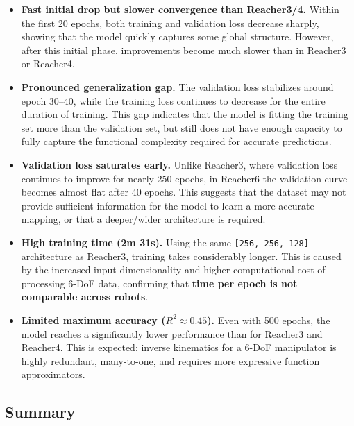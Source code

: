 \documentclass[a4paper,11pt]{article}
\begin{document}
\begin{itemize}

    \item \textbf{Fast initial drop but slower convergence than Reacher3/4.}  
    Within the first 20 epochs, both training and validation loss decrease 
    sharply, showing that the model quickly captures some global structure.  
    However, after this initial phase, improvements become much slower than in 
    Reacher3 or Reacher4.

    \item \textbf{Pronounced generalization gap.}  
    The validation loss stabilizes around epoch 30--40, while the training loss 
    continues to decrease for the entire duration of training.  
    This gap indicates that the model is fitting the training set more than the 
    validation set, but still does not have enough capacity to fully capture the 
    functional complexity required for accurate predictions.

    \item \textbf{Validation loss saturates early.}  
    Unlike Reacher3, where validation loss continues to improve for nearly 250 
    epochs, in Reacher6 the validation curve becomes almost flat after 40 epochs.  
    This suggests that the dataset may not provide sufficient information for the 
    model to learn a more accurate mapping, or that a deeper/wider architecture 
    is required.

    \item \textbf{High training time (2m 31s).}  
    Using the same \texttt{[256, 256, 128]} architecture as Reacher3, training 
    takes considerably longer.  
    This is caused by the increased input dimensionality and higher computational 
    cost of processing 6-DoF data, confirming that \textbf{time per epoch is not 
    comparable across robots}.

    \item \textbf{Limited maximum accuracy ($R^2 \approx 0.45$).}  
    Even with 500 epochs, the model reaches a significantly lower performance 
    than for Reacher3 and Reacher4.  
    This is expected: inverse kinematics for a 6-DoF manipulator is highly 
    redundant, many-to-one, and requires more expressive function approximators.

\end{itemize}

\subsection{Summary}
\end{document}
